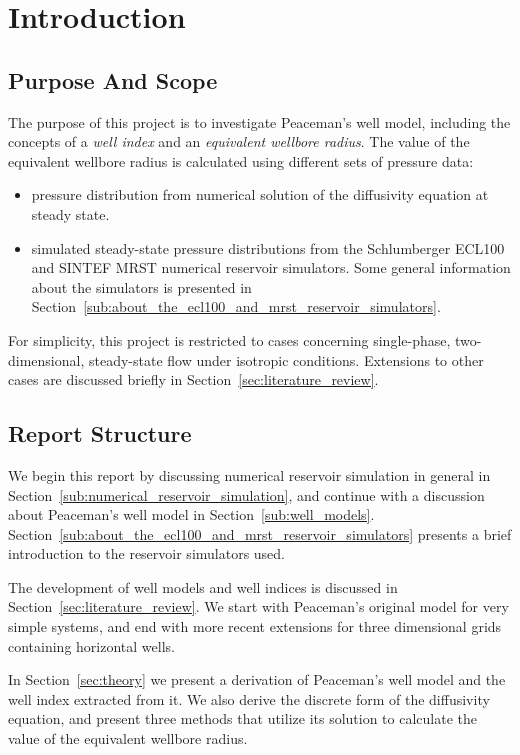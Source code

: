 
\section{Introduction} %
\label{sec:introduction}
\subsection{Purpose And Scope} %
\label{sub:purpose_and_scope}
The purpose of this project is to investigate Peaceman's well model, including the concepts of a \emph{well index} and an \emph{equivalent wellbore radius}. The value of the equivalent wellbore radius is calculated using different sets of  pressure data:
\begin{itemize}
    \item pressure distribution from numerical solution of the diffusivity equation at steady state.
    \item simulated steady-state pressure distributions from the Schlumberger ECL100 and SINTEF MRST numerical reservoir simulators. Some general information about the simulators is presented in Section~\ref{sub:about_the_ecl100_and_mrst_reservoir_simulators}.
\end{itemize}

For simplicity, this project is restricted to cases concerning single-phase, two-dimensional, steady-state flow under isotropic conditions. Extensions to other cases are discussed briefly in Section~\ref{sec:literature_review}.

\subsection{Report Structure} %
\label{sub:report_structure}
We begin this report by discussing numerical reservoir simulation in general in Section~\ref{sub:numerical_reservoir_simulation}, and continue with a discussion about Peaceman's well model in Section~\ref{sub:well_models}. Section~\ref{sub:about_the_ecl100_and_mrst_reservoir_simulators} presents a brief introduction to the reservoir simulators used.

The development of well models and well indices is discussed in Section~\ref{sec:literature_review}. We start with Peaceman's original model for very simple systems, and end with more recent extensions for three dimensional grids containing horizontal wells.

In Section~\ref{sec:theory} we present a derivation of Peaceman's well model and the well index extracted from it. We also derive the discrete form of the diffusivity equation, and present three methods that utilize its solution to calculate the value of the equivalent wellbore radius.

